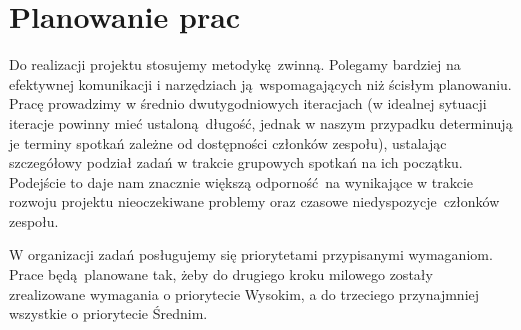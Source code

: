 \documentclass[a4paper,11pt]{article}
\begin{document}
\part{Planowanie prac}
Do realizacji projektu stosujemy metodykę zwinną.  Polegamy bardziej na
efektywnej komunikacji i narzędziach ją wspomagających niż ścisłym
planowaniu.  Pracę prowadzimy w średnio dwutygodniowych iteracjach (w
idealnej sytuacji iteracje powinny mieć ustaloną długość, jednak w
naszym przypadku determinują je terminy spotkań zależne od dostępności
członków zespołu), ustalając szczegółowy podział zadań w trakcie
grupowych spotkań na ich początku.  Podejście to daje nam znacznie
większą odporność na wynikające w trakcie rozwoju projektu nieoczekiwane
problemy oraz czasowe niedyspozycje członków zespołu.

W organizacji zadań posługujemy się priorytetami przypisanymi wymaganiom.
Prace będą planowane tak, żeby do drugiego kroku milowego zostały
zrealizowane wymagania o priorytecie Wysokim, a do trzeciego
przynajmniej wszystkie o priorytecie Średnim.
\end{document}
